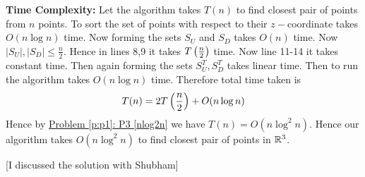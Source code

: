 \documentclass[a4paper, 11pt]{article}
\begin{document}
{\begin{enumerate}[label=(\alph*)]
	\begin{algorithm}
	\DontPrintSemicolon
	\caption{}
\end{algorithm}
\parinf

\textbf{Time Complexity:} Let the algorithm takes $T(n)$ to find closest pair of points from $n$ points. To sort the set of points with respect to their $z-$coordinate takes $O(n\log n)$ time. Now forming the sets $S_U$ and $S_D$ takes $O(n)$ time. Now $|S_U|,|S_D|\leq \frac{n}{2}$. Hence in lines 8,9 it takes $T\left(\frac{n}{2}\right)$ time. Now line 11-14 it takes constant time. Then again forming the sets $S_U^T,S_D^T$ takes linear time. Then to run the algorithm  takes $O(n\log n)$ time. Therefore total time taken is $$T(n)=2T\left(\frac{n}2\right)+O(n\log n)$$Hence by \hyperref[p:p1]{Problem \ref{p:p1}: P3 \ref{nlog2n}} we have $T(n)=O(n\log^2n)$. Hence our algorithm takes $O(n\log^2n)$ to find closest pair of points in $\mathbb{R}^3$.
\end{enumerate}
}\parinf

[I discussed the solution with Shubham]
\end{document}
